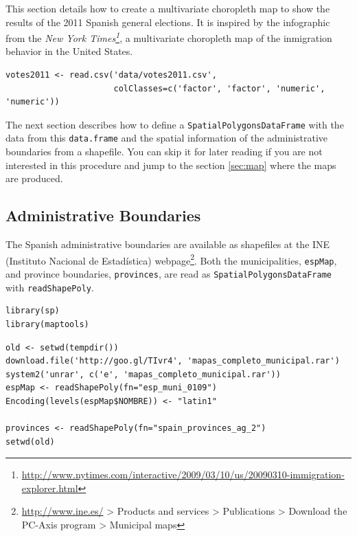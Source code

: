 \documentclass[smallroyalvopaper]{memoir}
\begin{document}
This section details how to create a multivariate choropleth map to
show the results of the 2011 Spanish general elections. It is inspired
by the infographic from the \emph{New York Times\footnote{\url{http://www.nytimes.com/interactive/2009/03/10/us/20090310-immigration-explorer.html}}}, a multivariate
choropleth map of the inmigration behavior in the United States.

\lstset{language=R,numbers=none}
\begin{lstlisting}
votes2011 <- read.csv('data/votes2011.csv',
                      colClasses=c('factor', 'factor', 'numeric', 'numeric'))
\end{lstlisting}

The next section describes how to define a \texttt{SpatialPolygonsDataFrame}
with the data from this \texttt{data.frame} and the spatial information of
the administrative boundaries from a shapefile. You can skip it for
later reading if you are not interested in this procedure and jump to
the section \ref{sec:map} where the maps are produced.

\subsection{\floweroneleft Administrative Boundaries}
\label{sec-1-1}

The Spanish administrative boundaries are available as shapefiles at
the INE (Instituto Nacional de Estadística) webpage\footnote{\url{http://www.ine.es/} > Products and services > Publications > Download the PC-Axis program > Municipal maps}. Both the
municipalities, \texttt{espMap}, and province boundaries, \texttt{provinces}, are
read as \texttt{SpatialPolygonsDataFrame} with \texttt{readShapePoly}.


\lstset{language=R,numbers=none}
\begin{lstlisting}
library(sp)
library(maptools)
\end{lstlisting}


\lstset{language=R,numbers=none}
\begin{lstlisting}
old <- setwd(tempdir())
download.file('http://goo.gl/TIvr4', 'mapas_completo_municipal.rar')
system2('unrar', c('e', 'mapas_completo_municipal.rar'))
espMap <- readShapePoly(fn="esp_muni_0109")
Encoding(levels(espMap$NOMBRE)) <- "latin1"

provinces <- readShapePoly(fn="spain_provinces_ag_2")
setwd(old)
\end{lstlisting}
\end{document}
